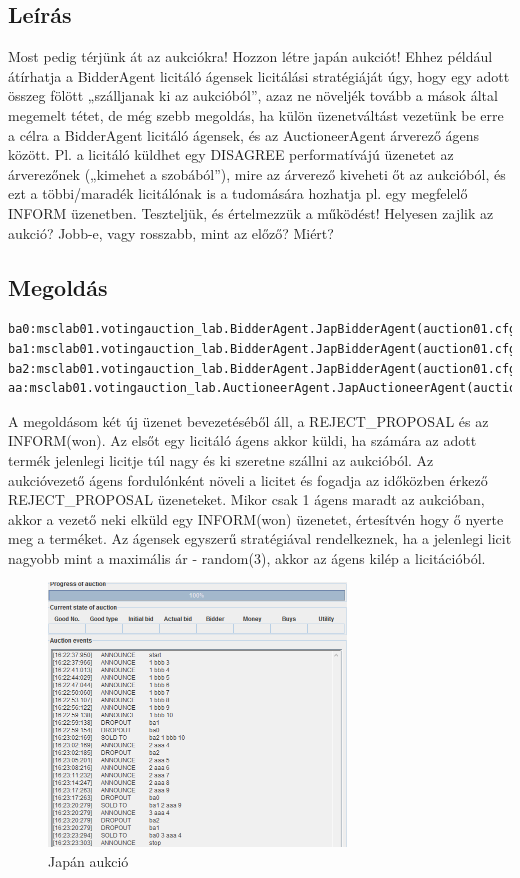 \subsection{Leírás}
Most pedig térjünk át az aukciókra! Hozzon létre japán aukciót! Ehhez például átírhatja a
BidderAgent licitáló ágensek licitálási stratégiáját úgy, hogy egy adott összeg fölött
„szálljanak ki az aukcióból”, azaz ne növeljék tovább a mások által megemelt tétet, de még
szebb megoldás, ha külön üzenetváltást vezetünk be erre a célra a BidderAgent licitáló
ágensek, és az AuctioneerAgent árverező ágens között. Pl. a licitáló küldhet egy
DISAGREE performatívájú üzenetet az árverezőnek („kimehet a szobából”), mire az árverező
kiveheti őt az aukcióból, és ezt a többi/maradék licitálónak is a tudomására hozhatja pl. egy
megfelelő INFORM üzenetben. Teszteljük, és értelmezzük a működést! Helyesen zajlik az
aukció? Jobb-e, vagy rosszabb, mint az előző? Miért?
\subsection{Megoldás}
\begin{lstlisting}[caption=Használt run-config, frame=single,float=!ht]
ba0:msclab01.votingauction_lab.BidderAgent.JapBidderAgent(auction01.cfg)
ba1:msclab01.votingauction_lab.BidderAgent.JapBidderAgent(auction01.cfg)
ba2:msclab01.votingauction_lab.BidderAgent.JapBidderAgent(auction01.cfg)
aa:msclab01.votingauction_lab.AuctioneerAgent.JapAuctioneerAgent(auction01.cfg)
\end{lstlisting}
A megoldásom két új üzenet bevezetéséből áll, a REJECT\_PROPOSAL és az INFORM(won). Az elsőt egy licitáló ágens akkor küldi, ha számára az adott termék jelenlegi licitje túl nagy és ki szeretne szállni az aukcióból. Az aukcióvezető ágens fordulónként növeli a licitet és fogadja az időközben érkező REJECT\_PROPOSAL üzeneteket. Mikor csak 1 ágens maradt az aukcióban, akkor a vezető neki elküld egy INFORM(won) üzenetet, értesítvén hogy ő nyerte meg a terméket. Az ágensek egyszerű stratégiával rendelkeznek, ha a jelenlegi licit nagyobb mint a maximális ár - random(3), akkor az ágens kilép a licitációból.
\begin{figure}[!h]
\begin{center}
\includegraphics[height=7cm]{figures/fel4.png}
\caption{Japán aukció}
\end{center}
\end{figure}


